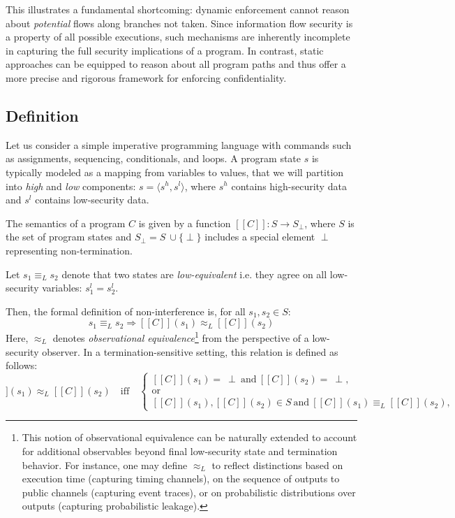 \documentclass[12pt,a4paper,twoside]{book}
\newcommand{\llbracket}{[\![}
\newcommand{\rrbracket}{]\!]}
\begin{document}
This illustrates a fundamental shortcoming: dynamic enforcement cannot reason about \textit{potential} flows along branches not taken. Since information flow security is a property of all possible executions\cite{sabelfeld2003language}\cite{denning1976lattice}, such mechanisms are inherently incomplete in capturing the full security implications of a program.
In contrast, static approaches can be equipped to reason about all program paths\cite{volpano1996sound} and thus offer a more precise and rigorous framework for enforcing confidentiality.

\subsection{Definition}
Let us consider a simple imperative programming language\cite{winskel1993formal} with commands such as assignments, sequencing, conditionals, and loops. A program state $s$ is typically modeled as a mapping from variables to values\cite{winskel1993formal}, that we will partition into \emph{high} and \emph{low} components: $s = \langle s^h, s^l \rangle$, where $s^h$ contains high-security data and $s^l$ contains low-security data.

The semantics of a program $C$ is given\cite{kahn1987natural}\cite{nielson1992semantics} by a function $\llbracket C \rrbracket : S \rightarrow S_\perp$, where $S$ is the set of program states and $S_\perp = S\ \cup \{ \perp \}$ includes a special element $\perp$ representing non-termination.

Let $s_1 \equiv_L s_2$ denote that two states are \emph{low-equivalent} i.e. they agree on all low-security variables: $s_1^l = s_2^l$.

Then, the formal definition of non-interference is\cite{volpano1996sound}\cite{goguen1982security}, for all $s_1, s_2 \in S$:
\[
  s_1 \equiv_L s_2 \Rightarrow \llbracket C \rrbracket(s_1) \approx_L \llbracket C \rrbracket(s_2)
\]
Here, \(\approx_L\) denotes \emph{observational equivalence}\footnote{This notion of observational equivalence can be naturally extended to account for additional observables beyond final low-security state and termination behavior\cite{sabelfeld2003language}. For instance, one may define \(\approx_L\) to reflect distinctions based on execution time (capturing timing channels), on the sequence of outputs to public channels (capturing event traces), or on probabilistic distributions over outputs (capturing probabilistic leakage).} from the perspective of a low-security observer. In a termination-sensitive setting\cite{hedin2012perspective}, this relation is defined as follows:
\begin{equation}
\llbracket C \rrbracket(s_1) \approx_L \llbracket C \rrbracket(s_2)
\quad\text{iff}\quad
\begin{cases}
\llbracket C \rrbracket(s_1) =\ \perp \ \text{and}\ \llbracket C \rrbracket(s_2) =\ \perp, \\
\text{or} \\
\llbracket C \rrbracket(s_1), \llbracket C \rrbracket(s_2) \in S \ \text{and}\
\llbracket C \rrbracket(s_1) \equiv_L \llbracket C \rrbracket(s_2),
\end{cases}
\label{eq:approx_tsni}
\end{equation}
\end{document}

